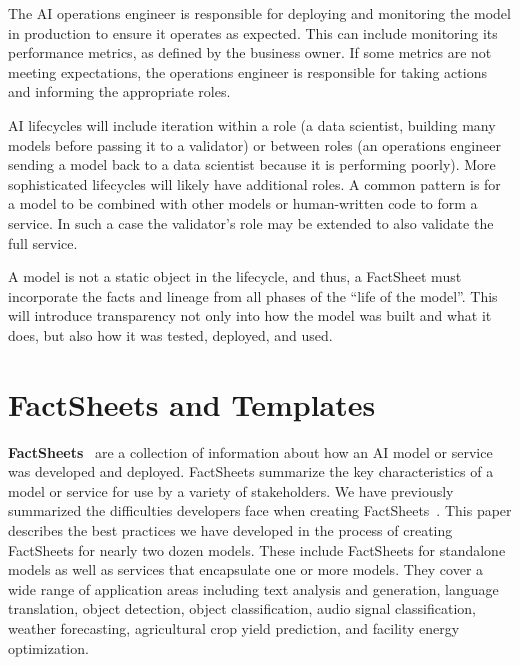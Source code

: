 \documentclass[11pt,dvipdfm]{article}
\begin{document}
The AI operations engineer is responsible for deploying and monitoring the model in production to ensure it operates as expected. This can include monitoring its performance metrics, as defined by the business owner. If some metrics are not meeting expectations, the operations engineer is responsible for taking actions and informing the appropriate roles.

AI lifecycles will include iteration within a role (a data scientist, building many models before passing it to a validator) or between roles (an operations engineer sending a model back to a data scientist because it is performing poorly).
More sophisticated lifecycles will likely have additional roles. A common pattern is for a model to be combined with other models or human-written code to form a service. In such a case the validator's role may be extended to also validate the full service.

A model is not a static object in the lifecycle, and thus, a FactSheet must incorporate the facts and lineage from all phases of the ``life of the model''.  This will introduce transparency not only into how the model was built and what it does, but also how it was tested, deployed, and used.

\section{FactSheets and Templates} \label{sec-FactSheets}

\textbf{FactSheets}~\cite{factsheets-2019} are a collection of information 
about how an AI model or service was developed and deployed.  
FactSheets summarize the key characteristics of a model or service for use by a variety of stakeholders. We have previously summarized the difficulties developers face when creating FactSheets~\cite{experiences-2020}. 
This paper describes the best practices we have developed in the process of creating FactSheets for nearly two dozen models.
These include FactSheets for standalone models as well as services that encapsulate one or more models.
They cover a wide range of application areas including text analysis and generation, language translation, object detection, object classification, audio signal classification, weather forecasting, agricultural crop yield prediction, and facility energy optimization.   
\end{document}
